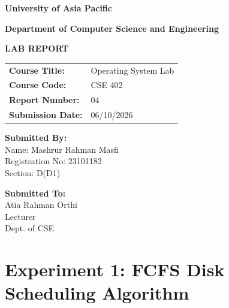 \documentclass[12pt,a4paper]{article}
\begin{document}
\begin{titlepage}
    \centering
    \vspace*{1cm}
    {\Huge \bfseries University of Asia Pacific \par}
    \vspace{0.5cm}
    {\Large \bfseries Department of Computer Science and Engineering \par}
    \vspace{2cm}
    {\huge \bfseries LAB REPORT \par}
    \vspace{1.5cm}
    
    \begin{tabular}{l l}
        \textbf{Course Title:} & Operating System Lab \\
        \textbf{Course Code:} & CSE 402 \\
        \textbf{Report Number:} & 04 \\
        \textbf{Submission Date:} & 06/10/2026 \\
    \end{tabular}
    
    \vspace{2.5cm}
    
    \begin{minipage}{0.45\textwidth}
        \begin{flushleft}
            \textbf{Submitted By:} \\
            Name: Mashrur Rahman Masfi \\
            Registration No: 23101182 \\
            Section: D(D1)
        \end{flushleft}
    \end{minipage}
    \hfill
    \begin{minipage}{0.45\textwidth}
        \begin{flushright}
            \textbf{Submitted To:} \\
            Atia Rahman Orthi \\
            Lecturer \\
            Dept. of CSE
        \end{flushright}
    \end{minipage}
    
    \vfill
\end{titlepage}

\section*{Experiment 1: FCFS Disk Scheduling Algorithm}
\end{document}
